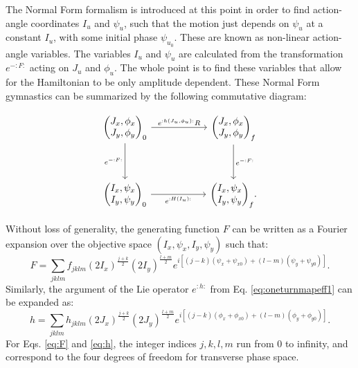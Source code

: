 The Normal Form formalism is introduced at this point in order to find action-angle coordinates $I_u$ and $\psi_u$, such that the motion just depends on $\psi_u$ at a constant $I_u$, with some initial phase $\psi_{u_0}$. These are known as non-linear action-angle variables. The variables $I_u$ and $\psi_u$ are calculated from the transformation $e^{-:F:}$ acting on $J_u$ and $\phi_u$. The whole point is to find these variables that allow for the Hamiltonian to be only amplitude dependent. These Normal Form gymnastics can be summarized by the following commutative diagram: 

\begin{equation}\begin{tikzcd}
	{\begin{pmatrix} J_x,\phi_x \\ J_y,\phi_y \end{pmatrix}_0} & {} & {\begin{pmatrix} J_x,\phi_x \\ J_y,\phi_y \end{pmatrix}_{f}} \\
	\\
	{\begin{pmatrix} I_x,\psi_x \\ I_y,\psi_y \end{pmatrix}_0} && {\begin{pmatrix} I_x,\psi_x \\ I_y,\psi_y \end{pmatrix}_{f}}
	\arrow["{e^{:h(J_u,\phi_u):}R}", from=1-1, to=1-3]
	\arrow["{e^{-:F:}}"', from=1-1, to=3-1]
	\arrow["{e^{:H(I_u):}}"', from=3-1, to=3-3]
	\arrow["{e^{-:F:}}", from=1-3, to=3-3]
    .
\end{tikzcd}\end{equation}

Without loss of generality, the generating function $F$ can be written as a Fourier expansion over the objective space $(I_x,\psi_x,I_y,\psi_y)$ such that:
\begin{equation}
    \label{eq:F}
    F=\sum_{jklm} f_{jklm} \left( 2 I_x\right)^{\frac{j+k}{2}} \left( 2 I_y\right)^{\frac{l+m}{2}} e^{i\left[ \left( j-k \right)\left( \psi_x+\psi_{x0} \right)+ \left( l-m \right) \left( \psi_y+\psi_{y0} \right)\right]}.
\end{equation}
Similarly, the argument of the Lie operator $e^{:h:}$ from Eq. \ref{eq:oneturnmapeff1} can be expanded as:
\begin{equation}
    \label{eq:h}
    h=\sum_{jklm} h_{jklm} \left( 2 J_x\right)^{\frac{j+k}{2}} \left( 2 J_y\right)^{\frac{l+m}{2}} e^{i\left[ \left( j-k \right)\left( \phi_x+\phi_{x0} \right)+ \left( l-m \right) \left( \phi_y+\phi_{y0} \right)\right]}.
\end{equation}
For Eqs. \ref{eq:F} and \ref{eq:h}, the integer indices $j,k,l,m$ run from $0$ to infinity, and correspond to the four degrees of freedom for transverse phase space.   

